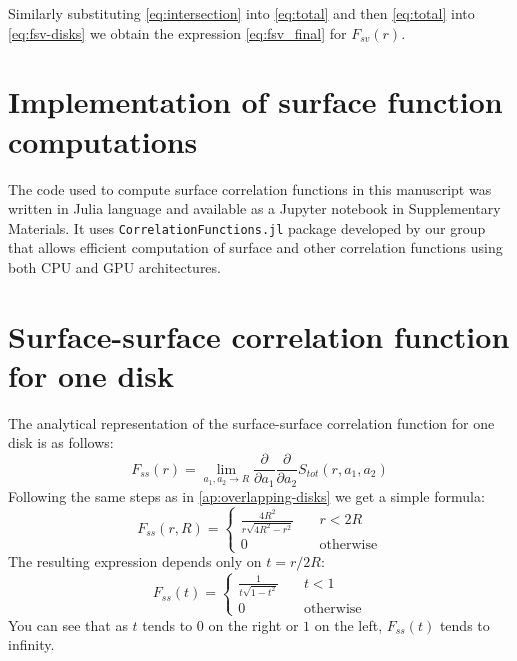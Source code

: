 \documentclass[reprint,amsmath,amssymb,aps,pre]{revtex4-1}
\newcommand{\code}[1]{\colorbox{light-gray}{\texttt{#1}}}
\begin{document}
Similarly substituting \cref{eq:intersection} into \cref{eq:total} and then
\cref{eq:total} into \cref{eq:fsv-disks} we obtain the expression
\cref{eq:fsv_final} for $F_{sv}(r)$.

\appendix
\section{Implementation of surface function computations}
The code used to compute surface correlation functions in this manuscript was
written in Julia language and available as a Jupyter notebook in Supplementary
Materials. It uses \code{CorrelationFunctions.jl} package developed by our group
\cite{CorrFunc.jl_paper} that allows efficient computation of surface and other
correlation functions using both CPU and GPU architectures.

\appendix
\section{Surface-surface correlation function for one disk}
The analytical representation of the surface-surface correlation function for
one disk is as follows:
\begin{equation*}
  F_{ss}(r) = \lim_{a_1, a_2 \rightarrow R} \frac{\partial}{\partial a_1}
  \frac{\partial}{\partial a_2} S_{tot}(r, a_1, a_2)
\end{equation*}
Following the same steps as in \cref{ap:overlapping-disks} we get a simple
formula:
\begin{equation*}
  F_{ss}(r,R) = \left\{
  \begin{array}{ll}
    \frac{4R^2}{r\sqrt{4R^2-r^2}} & \quad r < 2R \\
    0 & \quad \text{otherwise}
  \end{array} \right.
\end{equation*}
The resulting expression depends only on $t = r / 2R$:
\begin{equation*}
  F_{ss}(t) = \left\{
  \begin{array}{ll}
    \frac{1}{t\sqrt{1-t^2}} & \quad t < 1 \\
    0 & \quad \text{otherwise}
  \end{array} \right.
\end{equation*}
You can see that as $t$ tends to $0$ on the right or $1$ on the left,
$F_{ss}(t)$ tends to infinity.

\onecolumngrid


\twocolumngrid
\end{document}
